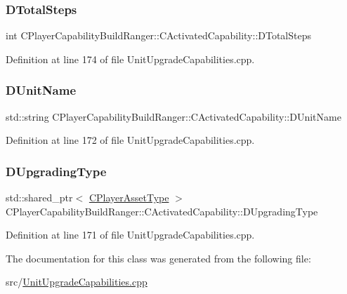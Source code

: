\subsubsection{\texorpdfstring{D\+Total\+Steps}{DTotalSteps}}
{\footnotesize\ttfamily int C\+Player\+Capability\+Build\+Ranger\+::\+C\+Activated\+Capability\+::\+D\+Total\+Steps\hspace{0.3cm}{\ttfamily [protected]}}



Definition at line 174 of file Unit\+Upgrade\+Capabilities.\+cpp.

\hypertarget{classCPlayerCapabilityBuildRanger_1_1CActivatedCapability_a0914856622c9b77b9943add2491c97be}{}\label{classCPlayerCapabilityBuildRanger_1_1CActivatedCapability_a0914856622c9b77b9943add2491c97be} 
\subsubsection{\texorpdfstring{D\+Unit\+Name}{DUnitName}}
{\footnotesize\ttfamily std\+::string C\+Player\+Capability\+Build\+Ranger\+::\+C\+Activated\+Capability\+::\+D\+Unit\+Name\hspace{0.3cm}{\ttfamily [protected]}}



Definition at line 172 of file Unit\+Upgrade\+Capabilities.\+cpp.

\hypertarget{classCPlayerCapabilityBuildRanger_1_1CActivatedCapability_a86cf7894dce398e7c5f4642e57e31682}{}\label{classCPlayerCapabilityBuildRanger_1_1CActivatedCapability_a86cf7894dce398e7c5f4642e57e31682} 
\subsubsection{\texorpdfstring{D\+Upgrading\+Type}{DUpgradingType}}
{\footnotesize\ttfamily std\+::shared\+\_\+ptr$<$ \hyperlink{classCPlayerAssetType}{C\+Player\+Asset\+Type} $>$ C\+Player\+Capability\+Build\+Ranger\+::\+C\+Activated\+Capability\+::\+D\+Upgrading\+Type\hspace{0.3cm}{\ttfamily [protected]}}



Definition at line 171 of file Unit\+Upgrade\+Capabilities.\+cpp.



The documentation for this class was generated from the following file\+:\begin{DoxyCompactItemize}
\item 
src/\hyperlink{UnitUpgradeCapabilities_8cpp}{Unit\+Upgrade\+Capabilities.\+cpp}\end{DoxyCompactItemize}
